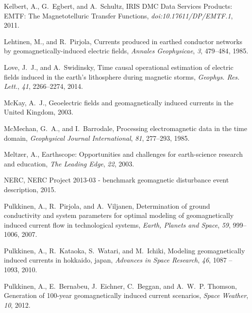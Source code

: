 \documentclass[linenumbers,draft]{agujournal}
\begin{document}
\begin{thebibliography}{27}
Kelbert, A., G.~Egbert, and A.~Schultz, {IRIS DMC Data Services Products: EMTF:
  The Magnetotelluric Transfer Functions}, {\it doi:10.17611/DP/EMTF.1\/},
  2011.

Lehtinen, M., and R.~Pirjola, Currents produced in earthed conductor networks
  by geomagnetically-induced electric fields, {\it {Annales Geophysicae}\/},
  {\it {3}\/}, {479--484}, {1985}.

Love, J.~J., and A.~Swidinsky, Time causal operational estimation of electric
  fields induced in the earth's lithosphere during magnetic storms, {\it
  Geophys. Res. Lett.\/}, {\it 41\/}, 2266--2274, 2014.

McKay, A.~J., Geoelectric fields and geomagnetically induced currents in the
  {U}nited {K}ingdom, 2003.

McMechan, G.~A., and I.~Barrodale, Processing electromagnetic data in the time
  domain, {\it Geophysical Journal International\/}, {\it 81\/}, 277--293,
  1985.

Meltzer, A., Earthscope: Opportunities and challenges for earth-science
  research and education, {\it The Leading Edge\/}, {\it 22\/}, 2003.

NERC, {NERC} {P}roject 2013-03 - benchmark geomagnetic disturbance event
  description, 2015.

Pulkkinen, A., R.~Pirjola, and A.~Viljanen, Determination of ground
  conductivity and system parameters for optimal modeling of geomagnetically
  induced current flow in technological systems, {\it Earth, Planets and
  Space\/}, {\it 59\/}, 999--1006, 2007.

Pulkkinen, A., R.~Kataoka, S.~Watari, and M.~Ichiki, Modeling geomagnetically
  induced currents in hokkaido, japan, {\it Advances in Space Research\/}, {\it
  46\/}, 1087 -- 1093, 2010.

Pulkkinen, A., E.~Bernabeu, J.~Eichner, C.~Beggan, and A.~W.~P. Thomson,
  Generation of 100-year geomagnetically induced current scenarios, {\it Space
  Weather\/}, {\it 10\/}, 2012.


\end{thebibliography}
\end{document}
